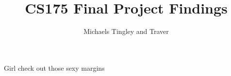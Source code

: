 \documentclass[11pt]{article}
\title{CS175 Final Project Findings}
\author{Michaels Tingley and Traver}
\begin{document}
  \maketitle

  Girl check out those sexy margins
\end{document}
